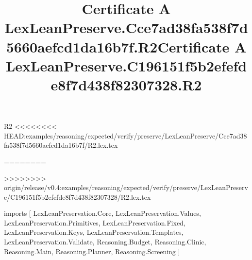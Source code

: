 \begin{lexlean}{R2}
<<<<<<<< HEAD:examples/reasoning/expected/verify/preserve/LexLeanPreserve/Cce7ad38fa538f7d5660aefcd1da16b7f/R2.lex.tex
\title{Certificate A LexLeanPreserve.Cce7ad38fa538f7d5660aefcd1da16b7f.R2}
========
\title{Certificate A LexLeanPreserve.C196151f5b2efefde8f7d438f82307328.R2}
>>>>>>>> origin/release/v0.4:examples/reasoning/expected/verify/preserve/LexLeanPreserve/C196151f5b2efefde8f7d438f82307328/R2.lex.tex
\begin{coremodule}
imports [
  LexLeanPreservation.Core,
  LexLeanPreservation.Values,
  LexLeanPreservation.Primitives,
  LexLeanPreservation.Fixed,
  LexLeanPreservation.Keys,
  LexLeanPreservation.Templates,
  LexLeanPreservation.Validate,
  Reasoning.Budget,
  Reasoning.Clinic,
  Reasoning.Main,
  Reasoning.Planner,
  Reasoning.Screening
]


\end{coremodule}
\end{lexlean}
